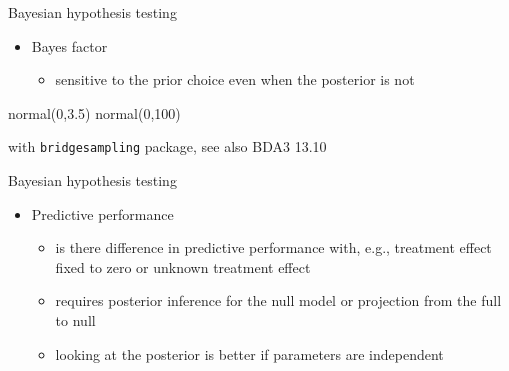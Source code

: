 \documentclass[english,t]{beamer}
\begin{document}
\begin{frame}{Bayesian hypothesis testing}

  \begin{itemize}
  \item Bayes factor
    \begin{itemize}
    \item sensitive to the prior choice even when the posterior is not
    \end{itemize}
  \end{itemize}
  normal(0,3.5) \hspace{4.5cm} normal(0,100)
  \begin{minipage}{14.1cm}
    \end{minipage}
      \vspace{-1.2\baselineskip}
    {\footnotesize\color{gray}\hspace{1cm}  with {\tt bridgesampling} package, see also BDA3 13.10}
\end{frame}

\begin{frame}[fragile]{Bayesian hypothesis testing}

  \begin{itemize}
  \item Predictive performance
    \begin{itemize}
    \item is there difference in predictive performance with, e.g.,
      treatment effect fixed to zero or unknown treatment effect
    \item requires posterior inference for the null model or
      projection from the full to null
    \item looking at the posterior is better if parameters are
      independent
    \end{itemize}
  \end{itemize}

\end{frame}
\end{document}
